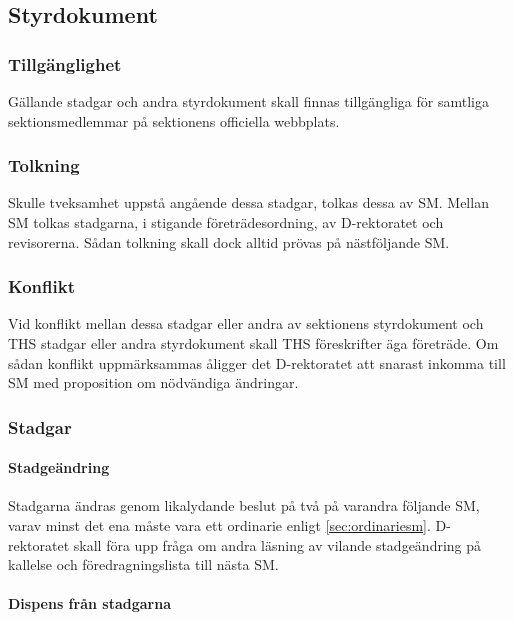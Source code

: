 \documentclass[a4paper,12pt]{article}
\begin{document}
\subsection{Styrdokument}
\label{sec:styrdokument}

\subsubsection{Tillgänglighet}

Gällande stadgar och andra styrdokument skall finnas tillgängliga för samtliga sektionsmedlemmar på sektionens officiella webbplats.

\subsubsection{Tolkning}

Skulle tveksamhet uppstå angående dessa stadgar, tolkas dessa av SM. Mellan SM tolkas stadgarna, i stigande företrädesordning, av D-rektoratet och revisorerna. Sådan tolkning skall dock alltid prövas på nästföljande SM.

\subsubsection{Konflikt}

Vid konflikt mellan dessa stadgar eller andra av sektionens styrdokument och THS stadgar eller andra styrdokument skall THS föreskrifter äga företräde. Om sådan konflikt uppmärksammas åligger det D-rektoratet att snarast inkomma till SM med proposition om nödvändiga ändringar.

\subsubsection{Stadgar}

\paragraph{Stadgeändring}

Stadgarna ändras genom likalydande beslut på två på varandra följande SM, varav minst det ena måste vara ett ordinarie enligt \ref{sec:ordinariesm}. D-rektoratet skall föra upp fråga om andra läsning av vilande stadgeändring på kallelse och föredragningslista till nästa SM.

\paragraph{Dispens från stadgarna}
\end{document}
